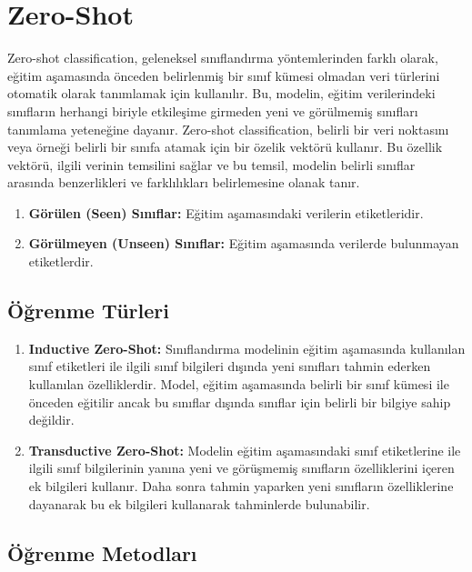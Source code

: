 \section{Zero-Shot}
Zero-shot classification, geleneksel sınıflandırma yöntemlerinden farklı olarak, eğitim aşamasında önceden belirlenmiş bir sınıf kümesi olmadan veri türlerini otomatik olarak tanımlamak için kullanılır. Bu, modelin, eğitim verilerindeki sınıfların herhangi biriyle etkileşime girmeden yeni ve görülmemiş sınıfları tanımlama yeteneğine dayanır. Zero-shot classification, belirli bir veri noktasını veya örneği belirli bir sınıfa atamak için bir özelik vektörü kullanır. Bu özellik vektörü, ilgili verinin temsilini sağlar ve bu temsil, modelin belirli sınıflar arasında benzerlikleri ve farklılıkları belirlemesine olanak tanır.

\begin{enumerate}
    \item \textbf{Görülen (Seen) Sınıflar:} Eğitim aşamasındaki verilerin etiketleridir.
    \item \textbf{Görülmeyen (Unseen) Sınıflar:} Eğitim aşamasında verilerde bulunmayan etiketlerdir.
\end{enumerate}

\subsection{Öğrenme Türleri}
\begin{enumerate}
    \item \textbf{Inductive Zero-Shot:} Sınıflandırma modelinin eğitim aşamasında kullanılan sınıf etiketleri ile ilgili sınıf bilgileri dışında yeni sınıfları tahmin ederken kullanılan özelliklerdir. Model, eğitim aşamasında belirli bir sınıf kümesi ile önceden eğitilir ancak bu sınıflar dışında sınıflar için belirli bir bilgiye sahip değildir.
    \item \textbf{Transductive Zero-Shot:} Modelin eğitim aşamasındaki sınıf etiketlerine ile ilgili sınıf bilgilerinin yanına yeni ve görüşmemiş sınıfların özelliklerini içeren ek bilgileri kullanır. Daha sonra tahmin yaparken yeni sınıfların özelliklerine dayanarak bu ek bilgileri kullanarak tahminlerde bulunabilir.
\end{enumerate}

\subsection{Öğrenme Metodları}

